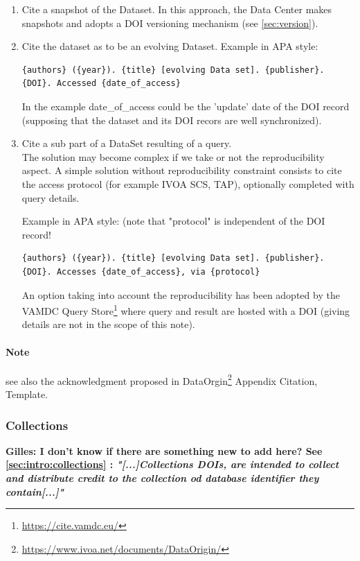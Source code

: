 \documentclass[11pt,a4paper]{ivoa}
\begin{document}
\begin{enumerate}
  \item Cite a snapshot of the Dataset. In this approach, the Data Center makes snapshots and adopts a DOI versioning mechanism (see \ref{sec:version}).
  \item  Cite the dataset as to be an evolving Dataset.
         Example in APA style:
\begin{verbatim}
{authors} ({year}). {title} [evolving Data set]. {publisher}.
{DOI}. Accessed {date_of_access}
\end{verbatim}

		In the example {date\_of\_access} could be the 'update' date of the DOI record (supposing that the dataset and its DOI recors are well synchronized).

	\item Cite a sub part of a DataSet resulting of a query.\\ 
	The solution may become complex if we take or not the reproducibility aspect.
	A simple solution without reproducibility constraint consists to cite the access protocol (for example IVOA SCS, TAP), optionally completed with query details.

	Example in APA style: (note that "protocol" is independent of the DOI record!
\begin{verbatim}
{authors} ({year}). {title} [evolving Data set]. {publisher}. 
{DOI}. Accesses {date_of_access}, via {protocol}	
\end{verbatim}

	An option taking into account the reproducibility has been adopted by the VAMDC Query Store\footnote{\url{https://cite.vamdc.eu/}} where query and result are hosted with a DOI (giving details are not in the scope of this note).
\end{enumerate}

\paragraph{Note} see also the acknowledgment proposed in DataOrgin\footnote{\url{https://www.ivoa.net/documents/DataOrigin/}} Appendix Citation, Template.

\subsubsection{Collections}
\textbf{\color{red} Gilles: I don't know if there are something new to add here?
See \ref{sec:intro:collections} : 
\textit{"[...]Collections DOIs, are intended to collect and distribute credit to the collection od database identifier they contain[...]"}
}
\end{document}
